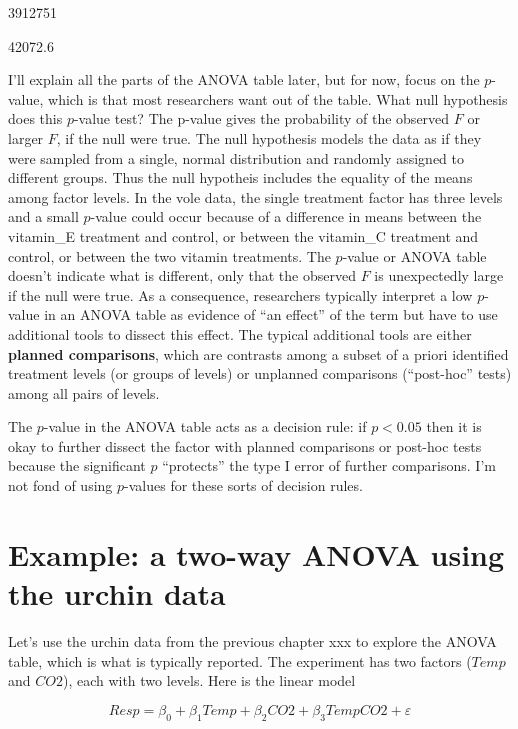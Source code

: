 \documentclass[]{book}
\begin{document}
3912751

42072.6

I'll explain all the parts of the ANOVA table later, but for now, focus
on the \(p\)-value, which is that most researchers want out of the
table. What null hypothesis does this \(p\)-value test? The p-value
gives the probability of the observed \(F\) or larger \(F\), if the null
were true. The null hypothesis models the data as if they were sampled
from a single, normal distribution and randomly assigned to different
groups. Thus the null hypotheis includes the equality of the means among
factor levels. In the vole data, the single treatment factor has three
levels and a small \(p\)-value could occur because of a difference in
means between the vitamin\_E treatment and control, or between the
vitamin\_C treatment and control, or between the two vitamin treatments.
The \(p\)-value or ANOVA table doesn't indicate what is different, only
that the observed \(F\) is unexpectedly large if the null were true. As
a consequence, researchers typically interpret a low \(p\)-value in an
ANOVA table as evidence of ``an effect'' of the term but have to use
additional tools to dissect this effect. The typical additional tools
are either \textbf{planned comparisons}, which are contrasts among a
subset of a priori identified treatment levels (or groups of levels) or
unplanned comparisons (``post-hoc'' tests) among all pairs of levels.

The \(p\)-value in the ANOVA table acts as a decision rule: if
\(p < 0.05\) then it is okay to further dissect the factor with planned
comparisons or post-hoc tests because the significant \(p\) ``protects''
the type I error of further comparisons. I'm not fond of using
\(p\)-values for these sorts of decision rules.

\section{Example: a two-way ANOVA using the urchin
data}\label{example-a-two-way-anova-using-the-urchin-data}

Let's use the urchin data from the previous chapter xxx to explore the
ANOVA table, which is what is typically reported. The experiment has two
factors (\(Temp\) and \(CO2\)), each with two levels. Here is the linear
model

\begin{equation}
Resp = \beta_0 + \beta_1 Temp + \beta_2 CO2 + \beta_3 TempCO2 + \varepsilon
\end{equation}
\end{document}
